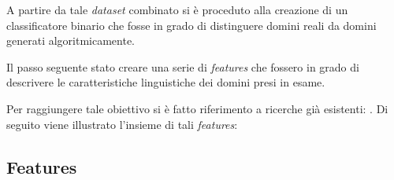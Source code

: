 
A partire da tale \textit{dataset} combinato si è proceduto alla creazione di un classificatore binario che fosse in grado di distinguere domini reali da domini generati algoritmicamente. 

Il passo seguente  stato creare una serie di \textit{features} che fossero in grado di descrivere le caratteristiche linguistiche dei domini presi in esame.


Per raggiungere tale obiettivo si è fatto riferimento a ricerche già esistenti: \cite{180232} \cite{Yadav:2010:DAG:1879141.1879148} \cite{Yadav:2012:DAG:2428696.2428722} \cite{Schiavoni2014}. Di seguito viene illustrato l'insieme di tali \textit{features}:

\subsection{Features}
\label{randomforestinterno}

